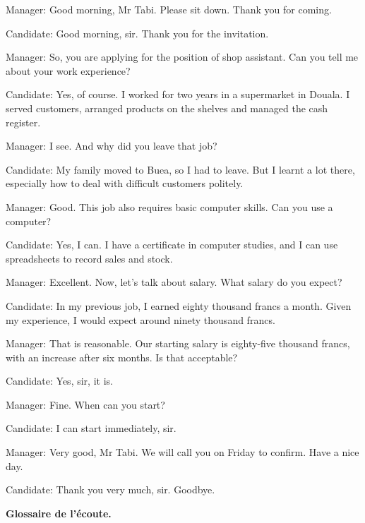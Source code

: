 \documentclass[11pt]{article}
\begin{document}
\begin{textebox}
Manager: Good morning, Mr Tabi. Please sit down. Thank you for coming.

Candidate: Good morning, sir. Thank you for the invitation.

Manager: So, you are applying for the position of shop assistant. Can you tell me about your work experience?

Candidate: Yes, of course. I worked for two years in a supermarket in Douala. I served customers, arranged products on the shelves and managed the cash register.

Manager: I see. And why did you leave that job?

Candidate: My family moved to Buea, so I had to leave. But I learnt a lot there, especially how to deal with difficult customers politely.

Manager: Good. This job also requires basic computer skills. Can you use a computer?

Candidate: Yes, I can. I have a certificate in computer studies, and I can use spreadsheets to record sales and stock.

Manager: Excellent. Now, let's talk about salary. What salary do you expect?

Candidate: In my previous job, I earned eighty thousand francs a month. Given my experience, I would expect around ninety thousand francs.

Manager: That is reasonable. Our starting salary is eighty-five thousand francs, with an increase after six months. Is that acceptable?

Candidate: Yes, sir, it is.

Manager: Fine. When can you start?

Candidate: I can start immediately, sir.

Manager: Very good, Mr Tabi. We will call you on Friday to confirm. Have a nice day.

Candidate: Thank you very much, sir. Goodbye.
\end{textebox}

\textbf{Glossaire de l'écoute.}\par
\end{document}
